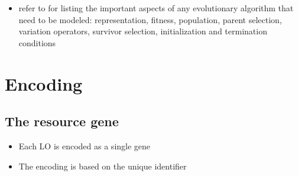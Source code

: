 \begin{itemize}
  \item refer to \citep{Eiben2007} for listing the important aspects of any evolutionary algorithm that need to be modeled: representation, fitness, population, parent selection, variation operators, survivor selection, initialization and termination conditions
\end{itemize}
\section{Encoding}
\subsection{The resource gene}
\begin{itemize}
	\item Each LO is encoded as a single gene
	\item The encoding is based on the unique identifier
\end{itemize}
